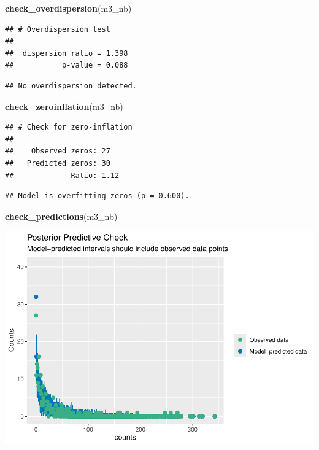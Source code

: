 \documentclass[
]{article}
\newenvironment{Shaded}{\begin{snugshade}}{\end{snugshade}}
\newcommand{\FunctionTok}[1]{\textcolor[rgb]{0.13,0.29,0.53}{\textbf{#1}}}
\newcommand{\NormalTok}[1]{#1}
\begin{document}
\begin{Shaded}
\begin{Highlighting}[]
\FunctionTok{check\_overdispersion}\NormalTok{(m3\_nb)}
\end{Highlighting}
\end{Shaded}

\begin{verbatim}
## # Overdispersion test
## 
##  dispersion ratio = 1.398
##           p-value = 0.088
\end{verbatim}

\begin{verbatim}
## No overdispersion detected.
\end{verbatim}

\begin{Shaded}
\begin{Highlighting}[]
\FunctionTok{check\_zeroinflation}\NormalTok{(m3\_nb)}
\end{Highlighting}
\end{Shaded}

\begin{verbatim}
## # Check for zero-inflation
## 
##    Observed zeros: 27
##   Predicted zeros: 30
##             Ratio: 1.12
\end{verbatim}

\begin{verbatim}
## Model is overfitting zeros (p = 0.600).
\end{verbatim}

\begin{Shaded}
\begin{Highlighting}[]
\FunctionTok{check\_predictions}\NormalTok{(m3\_nb)}
\end{Highlighting}
\end{Shaded}

\includegraphics{hw1-lobstrs-eds241_files/figure-latex/unnamed-chunk-27-1.pdf}
\end{document}
